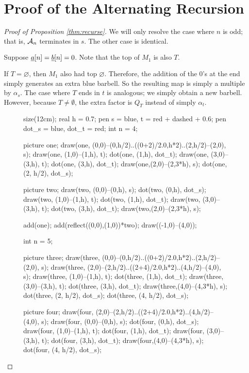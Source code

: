 \section{Proof of the Alternating Recursion}
\label{sec:recurse_proof}
\begin{proof}[Proof of Proposition \ref{thm:recurse}]
	We will only resolve the case where $n$ is odd; that is, $\AA_n$ terminates in $s$.  The other case is identical.
	\begin{enumerate}[(i)]
		\ii Suppose $\ul a[n] = \ul b[n] = 0$.  Note that the top of $M_1$ is also $T$.
		\begin{itemize}
			\ii If $T = \varnothing$, then $M_1$ also had top $\varnothing$.  Therefore, the addition of the $0$'s at the end simply generates an extra blue barbell.  So the resulting map is simply a multiple by $\alpha_s$.
			\ii The case where $T$ ends in $t$ is analogous; we simply obtain a new barbell.  However, because $T \neq \emptyset$, the extra factor is $Q_T$ instead of simply $\alpha_t$. 
			\begin{figure}[ht]
				\centering
				\begin{asy}
					size(12cm);
					real h = 0.7;
					pen s = blue, t = red + dashed + 0.6;
					pen dot_s = blue, dot_t = red;
					int n = 4;

					picture one;
					draw(one, (0,0)--(0,h/2)..((0+2)/2.0,h*2)..(2,h/2)--(2,0), s);
					draw(one, (1,0)--(1,h), t);
					dot(one, (1,h), dot_t);
					draw(one, (3,0)--(3,h), t);
					dot(one, (3,h), dot_t);
					draw(one,(2,0)--(2,3*h), s);
					dot(one, (2, h/2), dot_s);

					picture two;
					draw(two, (0,0)--(0,h), s);
					dot(two, (0,h), dot_s);
					draw(two, (1,0)--(1,h), t);
					dot(two, (1,h), dot_t);
					draw(two, (3,0)--(3,h), t);
					dot(two, (3,h), dot_t);
					draw(two,(2,0)--(2,3*h), s);

					add(one); add(reflect((0,0),(1,0))*two);
					draw((-1,0)--(4,0));

					int n = 5;

					picture three;
					draw(three, (0,0)--(0,h/2)..((0+2)/2.0,h*2)..(2,h/2)--(2,0), s);
					draw(three, (2,0)--(2,h/2)..((2+4)/2.0,h*2)..(4,h/2)--(4,0), s);
					draw(three, (1,0)--(1,h), t);
					dot(three, (1,h), dot_t);
					draw(three, (3,0)--(3,h), t);
					dot(three, (3,h), dot_t);
					draw(three,(4,0)--(4,3*h), s);
					dot(three, (2, h/2), dot_s);
					dot(three, (4, h/2), dot_s);

					picture four;
					draw(four, (2,0)--(2,h/2)..((2+4)/2.0,h*2)..(4,h/2)--(4,0), s);
					draw(four, (0,0)--(0,h), s);
					dot(four, (0,h), dot_s);
					draw(four, (1,0)--(1,h), t);
					dot(four, (1,h), dot_t);
					draw(four, (3,0)--(3,h), t);
					dot(four, (3,h), dot_t);
					draw(four,(4,0)--(4,3*h), s);
					dot(four, (4, h/2), dot_s);


\end{asy}
\end{figure}
\end{itemize}
\end{enumerate}
\end{proof}
